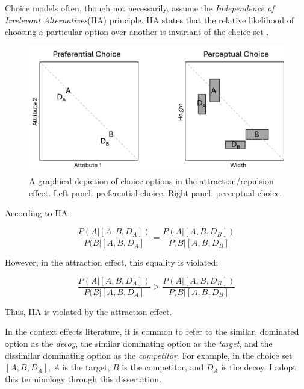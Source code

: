 Choice models often, though not necessarily, assume the \textit{Independence of Irrelevant Alternatives}(IIA) principle. IIA states that the relative likelihood of choosing a particular option over another is invariant of the choice set \parencite{ray1973independence}. 

\begin{figure}
   \includegraphics[width=\linewidth]{figures/pref_v_percep.jpg}
   \caption{A graphical depiction of choice options in the attraction/repulsion effect. Left panel: preferential choice. Right panel: perceptual choice.}
   \label{fig:fig_opts}
\end{figure}

According to IIA:

\begin{equation}
  \frac{P(A|[A,B,D_{A}])}{P(B|[A,B,D_{A}]}=\frac{P(A|[A,B,D_{B}])}{P(B|[A,B,D_{B}]}
  \label{eqn:iia}
\end{equation}

However, in the attraction effect, this equality is violated:

\begin{equation}
  \frac{P(A|[A,B,D_{A}])}{P(B|[A,B,D_{A}]}>\frac{P(A|[A,B,D_{B}])}{P(B|[A,B,D_{B}]}
  \label{eqn:iia_att}
\end{equation}

Thus, IIA is violated by the attraction effect.

In the context effects literature, it is common to refer to the similar, dominated option as the \textit{decoy}, the similar dominating option as the \textit{target}, and the dissimilar dominating option as the \textit{competitor}. For example, in the choice set $[A,B,D_{A}]$, $A$ is the target, $B$ is the competitor, and $D_{A}$ is the decoy. I adopt this terminology through this dissertation. 

